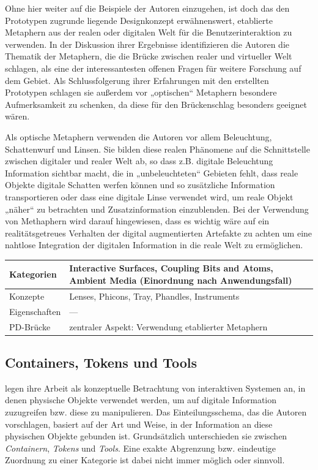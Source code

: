 Ohne hier weiter auf die Beispiele der Autoren einzugehen, ist doch das den Prototypen zugrunde liegende Designkonzept erwähnenswert, etablierte Metaphern aus der realen oder digitalen Welt für die Benutzerinteraktion zu verwenden. In der Diskussion ihrer Ergebnisse identifizieren die Autoren die Thematik der Metaphern, die die Brücke zwischen realer und virtueller Welt schlagen, als eine der interessantesten offenen Fragen für weitere Forschung auf dem Gebiet. Als Schlussfolgerung ihrer Erfahrungen mit den erstellten Prototypen schlagen sie außerdem vor „optischen“ Metaphern besondere Aufmerksamkeit zu schenken, da diese für den Brückenschlag besonders geeignet wären. 

Als optische Metaphern verwenden die Autoren vor allem Beleuchtung, Schattenwurf und Linsen. Sie bilden diese realen Phänomene auf die Schnittstelle zwischen digitaler und realer Welt ab, so dass z.B. digitale Beleuchtung Information sichtbar macht, die in „unbeleuchteten“ Gebieten fehlt, dass reale Objekte digitale Schatten werfen können und so zusätzliche Information transportieren oder dass eine digitale Linse verwendet wird, um reale Objekt „näher“ zu betrachten und Zusatzinformation einzublenden. Bei der Verwendung von Methaphern wird darauf hingewiesen, dass es wichtig wäre auf ein realitätsgetreues Verhalten der digital augmentierten Artefakte zu achten um eine nahtlose Integration der digitalen Information in die reale Welt zu ermöglichen.
\\[1em]
\begin{tabular}{| p{3cm} | p{10cm} |}
  \hline
  Kategorien & Interactive Surfaces, Coupling Bits and Atoms, Ambient Media (Einordnung nach Anwendungsfall) \\ \hline
  Konzepte & Lenses, Phicons, Tray, Phandles, Instruments \\ \hline
  Eigenschaften & --- \\ \hline
  PD-Brücke & zentraler Aspekt: Verwendung etablierter Metaphern \\ \hline
\end{tabular} 


\subsection{Containers, Tokens und Tools} %
\label{sub:containers_tokens_tools}

\citet{Holmquist99} legen ihre Arbeit als konzeptuelle Betrachtung von interaktiven Systemen an, in denen physische Objekte verwendet werden, um auf digitale Information zuzugreifen bzw. diese zu manipulieren. Das Einteilungsschema, das die Autoren vorschlagen, basiert auf der Art und Weise, in der Information an diese physischen Objekte gebunden ist. Grundsätzlich unterschieden sie zwischen \emph{Containern}, \emph{Tokens} und \emph{Tools}. Eine exakte Abgrenzung bzw. eindeutige Zuordnung zu einer Kategorie ist dabei nicht immer möglich oder sinnvoll.

